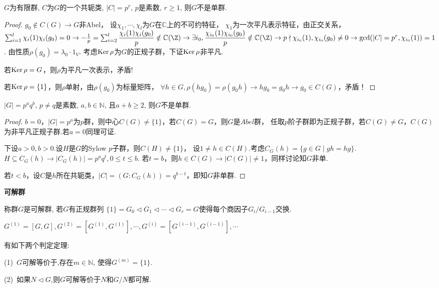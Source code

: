 \begin{proposition}
    $G$为有限群, $C$为$G$的一个共轭类, $|C|=p^r$, 
    $p$是素数, $r\geq 1$, 则$G$不是单群.
\end{proposition}
\begin{proof}
	$g_0\notin C(G)\rightarrow G$非Abel，
    设$\chi_1,\cdots,\chi_l$为$G$在$\mathbb C$上的不可约特征，
    $\chi _1$为一次平凡表示特征，由正交关系，$\sum_{i=1}^{l}\chi_i(1)\chi_i(g_0)=0
    \rightarrow -\frac{1}{p}=\sum_{i=2}^{l}\dfrac{\chi_i(1)\chi_i(g_0)}{p}
    \notin \mathbb C(\Z)
    \rightarrow \exists i_0,\dfrac{\chi_{i_0}(1)\chi_{i_0}(g_0)}{p}
    \notin \mathbb C(\Z)
    \rightarrow p\nmid \chi_{i_0}(1),\chi_{i_0}(g_0)\neq 0
    \rightarrow \gcd(|C|=p^r,\chi_{i_0}(1))=1$.
    由性质$\rho(g_0)=\lambda_0\cdot 1_V$.
    考虑$\operatorname{Ker}\rho $为$G$的正规子群，下证$\operatorname{Ker}\rho$非平凡.
	
	若$\operatorname{Ker}\rho =G$，则$\rho $为平凡一次表示，矛盾!
	
	若$\operatorname{Ker}\rho=\{1\}$，则$\rho$单射，由$\rho(g_0)$为标量矩阵，
    $\forall h\in G,\rho(hg_0)=\rho(g_0h)\rightarrow hg_0=g_0h
    \rightarrow g_0\in C(G)$，矛盾！
\end{proof}
\begin{proposition}
    $|G|=p^aq^b$, $p\neq q$是素数, 
    $a,b\in \mathbb{N}$, 且$a+b\geq 2$, 则$G$不是单群.
\end{proposition}
\begin{proof}
	$b=0$，$|G|=p^a$为$p$群，则中心$C(G)\neq\{1\}$，若$C(G)=G$，则$G$是$Abel$群，
    任取$p$阶子群即为正规子群，若$C(G)\neq G$，$C(G)$为非平凡正规子群.若$a=0$同理可证.
	
	下设$a>0,b>0$.设$H$是$G$的Sylow $p$子群，则$C(H)\neq \{1\}$，
    设$1\neq h\in C(H)$.考虑$C_G(h)=\{g\in G\mid gh=hg\}$.
    $H\subseteq C_G(h)\rightarrow |C_G(h)|=p^aq^t,0\leq t\leq b$.
    若$t=b$，则$h\in C(G)\rightarrow |C(G)|\neq 1$，同样讨论知$G$非单.
	
	若$t<b$，设$C$是$h$所在共轭类，$|C|=(G:C_G(h))=q^{b-t}$，即知$G$非单群.
\end{proof}
\begin{definition} \textbf{可解群}\par
    \qquad 称群$G$是可解群, 若$G$有正规群列
    $\{1\}=G_0\lhd G_1\lhd \cdots \lhd G_r=G$使得每个商因子$G_i/G_{i-1}$交换.\par
    \qquad $G^{(1)}=[G,G], G^{(2)}=[G^{(1)},G^{(1)}],\cdots, 
    G^{(i)}=[G^{(i-1)},G^{(i-1)}], \cdots$\par
    \qquad 有如下两个判定定理:

    (1)\ $G$可解等价于,存在$m\in \mathbb{N}$, 使得$G^{(m)}=\{1\}$.\par
    (2)\ 如果$N\lhd G$,则$G$可解等价于$N$和$G/N$都可解.
\end{definition}
